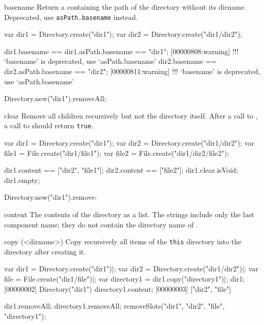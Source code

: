 \begin{urbiscriptapi}
\item[basename] Return a  containing the path of the
  directory without its dirname.  Deprecated, use
  \lstinline|asPath.basename| instead.
\begin{urbiassert}[firstnumber=1]
var dir1 = Directory.create("dir1");
var dir2 = Directory.create("dir1/dir2");

dir1.basename == dir1.asPath.basename == "dir1";
[00000808:warning] !!! `basename' is deprecated, use `asPath.basename'
dir2.basename == dir2.asPath.basename == "dir2";
[00000811:warning] !!! `basename' is deprecated, use `asPath.basename'
\end{urbiassert}
\begin{urbicomment}
Directory.new("dir1").removeAll;
\end{urbicomment}


\item[clear]
  Remove all children recursively but not the directory itself. After a
  call to , a call to  should return
  \lstinline|true|.
\begin{urbiassert}
var dir1 = Directory.create("dir1");
var dir2 = Directory.create("dir1/dir2");
var file1 = File.create("dir1/file1");
var file2 = File.create("dir1/dir2/file2");

dir1.content == ["dir2", "file1"];
dir2.content == ["file2"];
dir1.clear.isVoid;
dir1.empty;
\end{urbiassert}
\begin{urbicomment}
Directory.new("dir1").remove;
\end{urbicomment}


\item[content]
  The contents of the directory as a  list.  The
  strings include only the last component name; they do not contain
  the directory name of \this.


\item[copy](<dirname>)
  Copy recursively all items of the \lstinline|this| directory
  into the directory  after creating it.
\begin{urbiscript}
var dir1 = Directory.create("dir1")|;
var dir2 = Directory.create("dir1/dir2")|;
var file = File.create("dir1/file")|;
var directory1 = dir1.copy("directory1")|;
dir1;
[00000002] Directory("dir1")
directory1.content;
[00000003] ["dir2", "file"]
\end{urbiscript}
\begin{urbicomment}
dir1.removeAll;
directory1.removeAll;
removeSlots("dir1", "dir2", "file", "directory1");
\end{urbicomment}



\end{urbiscriptapi}
